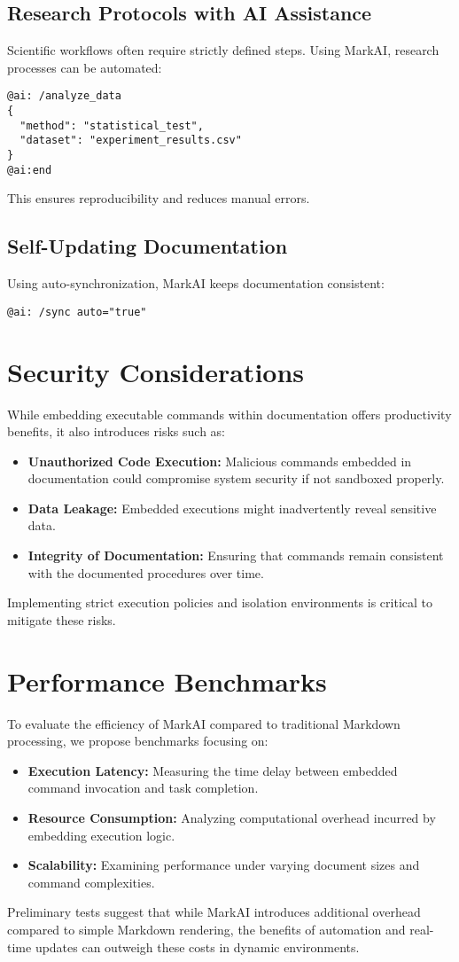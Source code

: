 \documentclass{article}
\begin{document}
\subsection{Research Protocols with AI Assistance}
Scientific workflows often require strictly defined steps. Using MarkAI, research processes can be automated:
\begin{lstlisting}
@ai: /analyze_data
{
  "method": "statistical_test",
  "dataset": "experiment_results.csv"
}
@ai:end
\end{lstlisting}
This ensures reproducibility and reduces manual errors.

\subsection{Self-Updating Documentation}
Using auto-synchronization, MarkAI keeps documentation consistent:
\begin{lstlisting}
@ai: /sync auto="true"
\end{lstlisting}

\section{Security Considerations}
While embedding executable commands within documentation offers productivity benefits, it also introduces risks such as:
\begin{itemize}
    \item \textbf{Unauthorized Code Execution:} Malicious commands embedded in documentation could compromise system security if not sandboxed properly.
    \item \textbf{Data Leakage:} Embedded executions might inadvertently reveal sensitive data.
    \item \textbf{Integrity of Documentation:} Ensuring that commands remain consistent with the documented procedures over time.
\end{itemize}
Implementing strict execution policies and isolation environments is critical to mitigate these risks.

\section{Performance Benchmarks}
To evaluate the efficiency of MarkAI compared to traditional Markdown processing, we propose benchmarks focusing on:
\begin{itemize}
    \item \textbf{Execution Latency:} Measuring the time delay between embedded command invocation and task completion.
    \item \textbf{Resource Consumption:} Analyzing computational overhead incurred by embedding execution logic.
    \item \textbf{Scalability:} Examining performance under varying document sizes and command complexities.
\end{itemize}
Preliminary tests suggest that while MarkAI introduces additional overhead compared to simple Markdown rendering, the benefits of automation and real-time updates can outweigh these costs in dynamic environments.
\end{document}
